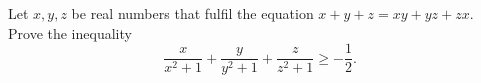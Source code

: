Let $x,y,z$ be real numbers that fulfil the equation $x+y+z=xy+yz+zx$. Prove the inequality
$$\frac{x}{x^2+1}+\frac{y}{y^2+1}+\frac{z}{z^2+1} \geq -\frac{1}{2}.$$